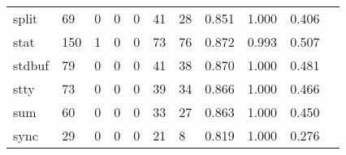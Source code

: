 \begin{longtable}{lp{1.2cm}p{1.2cm}p{1.2cm}p{1.2cm}p{1.2cm}p{1.2cm}p{1.2cm}p{1.2cm}p{1.2cm}p{1.2cm}}
split     &                                    69 &                                                  0 &                                                  0 &                                                  0 &                                                 41 &                                                 28 &                                              0.851 &                                              1.000 &                                              0.406 \\
stat      &                                   150 &                                                  1 &                                                  0 &                                                  0 &                                                 73 &                                                 76 &                                              0.872 &                                              0.993 &                                              0.507 \\
stdbuf    &                                    79 &                                                  0 &                                                  0 &                                                  0 &                                                 41 &                                                 38 &                                              0.870 &                                              1.000 &                                              0.481 \\
stty      &                                    73 &                                                  0 &                                                  0 &                                                  0 &                                                 39 &                                                 34 &                                              0.866 &                                              1.000 &                                              0.466 \\
sum       &                                    60 &                                                  0 &                                                  0 &                                                  0 &                                                 33 &                                                 27 &                                              0.863 &                                              1.000 &                                              0.450 \\
sync      &                                    29 &                                                  0 &                                                  0 &                                                  0 &                                                 21 &                                                  8 &                                              0.819 &                                              1.000 &                                              0.276 \\

\end{longtable}
